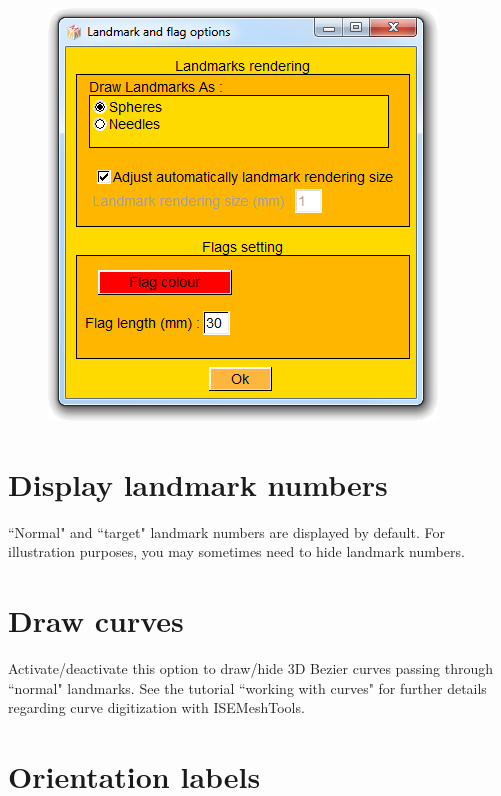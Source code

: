 \begin{figure}
  \centering  
 \includegraphics[scale=0.5]{images/Viewing_options/Landmark_options.png}
\label{landmarks_flags_options}
\end{figure}

\section{Display landmark numbers}
``Normal" and ``target" landmark numbers are displayed by default. For illustration purposes, you may sometimes need to hide landmark numbers.

\section{Draw curves}
Activate/deactivate this option to draw/hide 3D Bezier curves passing through ``normal" landmarks. See the tutorial ``working with curves" for further details regarding curve digitization with ISEMeshTools.

\section{Orientation labels}


